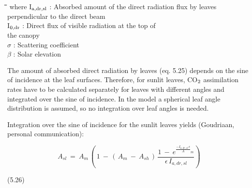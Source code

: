 \documentclass[11pt]{article}
\begin{document}
\nwln
\begin{tabbing}
\hspace{1.27cm}\=\hspace{1.27cm}\=\hspace{1.27cm}\=\hspace{1.27cm}\=%
\hspace{1.27cm}\=\hspace{1.27cm}\=\hspace{1.27cm}\=\hspace{1.27cm}\=%
\hspace{1.27cm}\=\hspace{1.27cm}\=\kill
where\> I$_{{\rm a,dr,sl}}$\> : Absorbed amount of the direct radiation flux by leaves\\
\>\>   perpendicular to the direct beam\> \> \> \> \> \> \> \> [J m$^{{\rm -2}}$ s$^{{\rm -1}}$]\\
\>I$_{{\rm 0,dr}}$\> : Direct flux of visible radiation at the top of \\
                  the canopy\> \> \> \> \> \> \> \> \> \> [J m$^{{\rm -2}}$ s$^{{\rm -1}}$]\\
\>$\sigma$\> : Scattering coefficient\> \> \> \> \> \> \> \> [-]\\
\>$\beta$\> : Solar elevation\> \> \> \> \> \> \> \> [degrees]
\end{tabbing}

\bigskip
\bigskip
The amount of absorbed direct radiation by leaves (eq. 5.25) depends on the sine of
incidence at the leaf surfaces. Therefore, for sunlit leaves, CO$_{{\rm 2}}$ assimilation rates have to
be calculated separately for leaves with different angles and integrated over the sine of
incidence. In the model a spherical leaf angle distribution is assumed, so no integration
over leaf angles is needed.

\bigskip
\bigskip
Integration over the sine of incidence for the sunlit leaves yields (Goudriaan, personal
communication):

\begin{displaymath}
A _{sl} ~=~ A _{m} \, (\, 1~-\, (\, A _{m} ~-~A _{sh} \, )\, {{\frac{ 1~-~e ^{{\frac{{{-I _{a,dr,sl} \, \epsilon }}}{A}} _{m} } }{\epsilon\, I _{a,dr,sl} }} })
\end{displaymath}

\bigskip
\strut\hfill (5.26)
\end{document}
